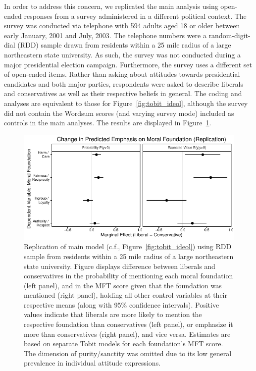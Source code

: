 \documentclass[12pt]{article}
\begin{document}
In order to address this concern, we replicated the main analysis using open-ended responses from a survey administered in a different political context. The survey was conducted via telephone with 594 adults aged 18 or older between early January, 2001 and July, 2003. The telephone numbers were a random-digit-dial (RDD) sample drawn from residents within a 25 mile radius of a large northeastern state university. As such, the survey was not conducted during a  major presidential election campaign. Furthermore, the survey uses a different set of open-ended items. Rather than asking about attitudes towards presidential candidates and both major parties, respondents were asked to describe liberals and conservatives as well as their respective beliefs in general. The coding and analyses are equivalent to those for Figure~\ref{fig:tobit_ideol}, although the survey did not contain the Wordsum scores (and varying survey mode) included as controls in the main analyses. The results are displayed in Figure~\ref{fig:tobit_ideol_lisurvey}.

\begin{figure}[ht]\centering
\includegraphics{../calc/fig/tobit_ideol_lisurvey.pdf}
\caption{Replication of main model (c.f., Figure~\ref{fig:tobit_ideol}) using RDD sample from residents within a 25 mile radius of a large northeastern  state university. Figure displays difference between liberals and conservatives in the probability of mentioning each moral foundation (left panel), and in the MFT score given that the foundation was mentioned (right panel), holding all other control variables at their respective means (along with 95\% confidence intervals). Positive values indicate that liberals are more likely to mention the respective foundation than conservatives (left panel), or emphasize it more than conservatives (right panel), and vice versa. Estimates are based on separate Tobit models for each foundation's MFT score. The dimension of purity/sanctity was omitted due to its low general prevalence in individual attitude expressions. %
}\label{fig:tobit_ideol_lisurvey}
\end{figure}
\end{document}
